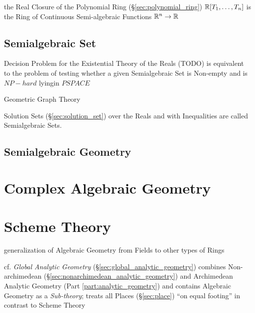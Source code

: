 the Real Closure of the Polynomial Ring (\S\ref{sec:polynomial_ring})
$\mathbb{R}[T_1,\ldots,T_n]$ is the Ring of Continuous Semi-algebraic Functions
$\mathbb{R}^n \rightarrow \mathbb{R}$



\subsection{Semialgebraic Set}\label{sec:semialgebraic_set}

Decision Problem for the Existential Theory of the Reals (TODO) is equivalent
to the problem of testing whether a given Semialgebraic Set is Non-empty and is
$NP-hard$ lyingin $PSPACE$

Geometric Graph Theory

Solution Sets (\S\ref{sec:solution_set}) over the Reals and with Inequalities
are called Semialgebraic Sets.



\subsection{Semialgebraic Geometry}\label{sec:semialgebraic_geometry}



\section{Complex Algebraic Geometry}
\label{sec:complex_algebraic_geometry}

\section{Scheme Theory}\label{sec:scheme_theory}

generalization of Algebraic Geometry from Fields to other types of Rings

\fist cf. \emph{Global Analytic Geometry} (\S\ref{sec:global_analytic_geometry})
combines Non-archimedean (\S\ref{sec:nonarchimedean_analytic_geometry}) and
Archimedean Analytic Geometry (Part \ref{part:analytic_geometry}) and contains
Algebraic Geometry as a \emph{Sub-theory}; treats all Places
(\S\ref{sec:place}) ``on equal footing'' in contrast to Scheme Theory

